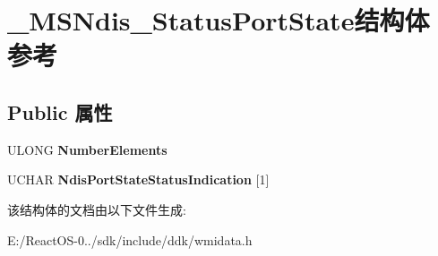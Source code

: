 \hypertarget{struct___m_s_ndis___status_port_state}{}\section{\+\_\+\+M\+S\+Ndis\+\_\+\+Status\+Port\+State结构体 参考}
\label{struct___m_s_ndis___status_port_state}
\subsection*{Public 属性}
\begin{DoxyCompactItemize}
\item 
\mbox{\label{struct___m_s_ndis___status_port_state_afd96ab32d3f60b1a8434c2b3207f5168}} 
U\+L\+O\+NG {\bfseries Number\+Elements}
\item 
\mbox{\label{struct___m_s_ndis___status_port_state_a46f962844940cf652111b01bfaee1c0b}} 
U\+C\+H\+AR {\bfseries Ndis\+Port\+State\+Status\+Indication} \mbox{[}1\mbox{]}
\end{DoxyCompactItemize}


该结构体的文档由以下文件生成\+:\begin{DoxyCompactItemize}
\item 
E\+:/\+React\+O\+S-\/0../sdk/include/ddk/wmidata.\+h\end{DoxyCompactItemize}
